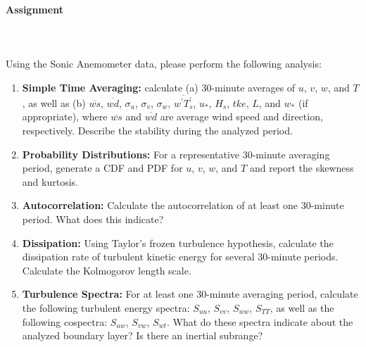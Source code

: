 \documentclass[11pt]{article}
\begin{document}
\paragraph{\large Assignment}~\\~\\
Using the Sonic Anemometer data, please perform the following analysis:
\vspace{-10pt}
\begin{enumerate}
	\item \textbf{Simple Time Averaging:} calculate (a) 30-minute averages of $u$, $v$, $w$, and $T$, as well as (b) $\overline{ws}$, $\overline{wd}$, $\sigma_u$, $\sigma_v$, $\sigma_w$, $\overline{w^\prime T_s^\prime}$, $u_*$, $H_s$, $tke$, $L$, and $w_*$ (if appropriate), where $\overline{ws}$ and $\overline{wd}$ are average wind speed and direction, respectively. Describe the stability during the analyzed period.
	\item \textbf{Probability Distributions:} For a representative 30-minute averaging period, generate a CDF and PDF for $u$, $v$, $w$, and $T$ and report the skewness and kurtosis.
	\item \textbf{Autocorrelation:} Calculate the autocorrelation of at least one 30-minute period. What does this indicate?
	\item \textbf{Dissipation: } Using Taylor's frozen turbulence hypothesis, calculate the dissipation rate of turbulent kinetic energy for several 30-minute periods. Calculate the Kolmogorov length scale.
	\item \textbf{Turbulence Spectra:} For at least one 30-minute averaging period, calculate the following turbulent energy spectra: $S_{uu}$, $S_{vv}$, $S_{ww}$, $S_{TT}$, as well as the following cospectra: $S_{uw}$, $S_{vw}$, $S_{wt}$. What do these spectra indicate about the analyzed boundary layer? Is there an inertial subrange?
\end{enumerate}
\end{document}
